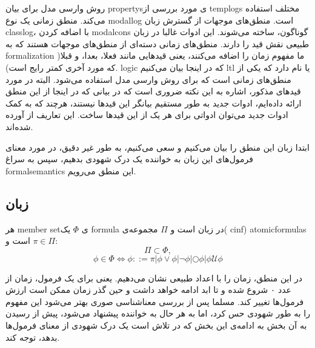 روش وارسی مدل برای بیان \glspl*{property}ی مورد بررسی از \glspl*{templog} مختلف استفاده می‌کند. منطق زمانی یک نوع \gls*{modallog} است. منطق‌های موجهات از گسترش زبان \gls*{classlog}، با اضافه کردن \glspl*{modalcon} گوناگون، ساخته می‌شوند. این ادوات غالبا در زبان طبیعی نقش قید را دارند. منطق‌های زمانی دسته‌ای از منطق‌های موجهات هستند که به \gls*{formalization} ما مفهوم زمان را اضافه می‌کنند، یعنی قیدهایی مانند فعلا، بعدا، و قبلا( که مورد آخری کمتر رایج است). \gls*{logic} که در اینجا بیان می‌کنیم \gls{ltl} یا  نام دارد که یکی از منطق‌های زمانی است که برای روش وارسی مدل استفاده می‌شود. البته در مورد قیدهای مذکور، اشاره به این نکته ضروری است که در بیانی که در اینجا از این منطق ارائه داده‌ایم، ادوات جدید به‌ طور مستقیم بیانگر این قید‌ها نیستند، هرچند که به کمک ادوات جدید می‌توان ادواتی برای هر یک از این قیدها ساخت.
این تعاریف از \cite{buchi} آورده شده‌اند.

ابتدا زبان این منطق را بیان می‌کنیم و سعی می‌کنیم، به طور غیر دقیق، در مورد معنای فرمول‌های این زبان به خواننده یک درک شهودی بدهیم، سپس به سراغ \gls*{formalsemantics} این منطق می‌رویم.

\subsection{زبان }
\begin{defn}
	هر \gls*{member} \gls*{set}ی $\Phi$ یک \gls*{formula} در زبان  است و $\Pi$ مجموعه‌ی‌( \gls*{cinf}) \glspl*{atomicformula} است و $\pi \in \Pi$:
	$$
	\Pi \subset \Phi,
	$$
	$$
	\phi \in \Phi \Leftrightarrow
	\phi ::= \pi | \phi \lor \phi |
	\neg \phi |
	\bigcirc \phi |
	\phi \mathcal{U}\phi 
$$	
	
\end{defn}
در این منطق، زمان را با اعداد طبیعی نشان می‌دهیم. یعنی برای یک فرمول، زمان از عدد ۰ شروع شده و تا ابد ادامه خواهد داشت و حین گذر زمان ممکن است ارزش فرمول‌ها تغییر کند. مسلما پس از بررسی معناشناسی صوری بهتر می‌شود این مفهوم را به طور شهودی حس کرد، اما به هر حال به خواننده پیشنهاد می‌شود، پیش از رسیدن به آن بخش به ادامه‌ی این بخش که در تلاش است یک درک شهودی از معنای فرمول‌ها بدهد، توجه کند. 

